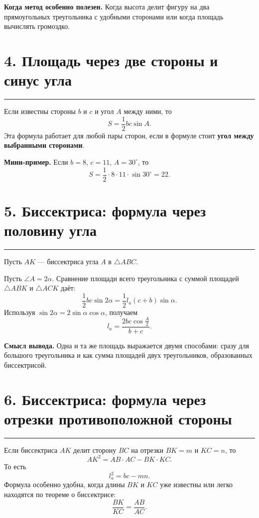 \documentclass[a4paper,12pt]{article}
\newcommand{\sectionline}{\par\vspace{0.2em}\noindent\color{rulegray}\rule{\linewidth}{0.6pt}\par\color{textgray}\vspace{0.45em}}
\newcommand{\key}[1]{\textcolor{darkaccent}{\textbf{#1}}}
\newcommand{\formula}[1]{\[\boxed{#1}\]}
\begin{document}
\key{Когда метод особенно полезен.} Когда высота делит фигуру на два прямоугольных треугольника с удобными сторонами или когда площадь вычислять громоздко.

\section*{4. Площадь через две стороны и синус угла}
\sectionline
Если известны стороны $b$ и $c$ и угол $A$ между ними, то
\formula{S=\frac12 bc\sin A.}
Эта формула работает для любой пары сторон, если в формуле стоит \key{угол между выбранными сторонами}.

\textbf{Мини-пример.} Если $b=8$, $c=11$, $A=30^\circ$, то
\[
S=\frac12\cdot8\cdot11\cdot\sin30^\circ=22.
\]

\clearpage
\section*{5. Биссектриса: формула через половину угла}
\sectionline
Пусть $AK$ --- биссектриса угла $A$ в $\triangle ABC$.

\begin{center}
\end{center}

Пусть $\angle A=2\alpha$. Сравнение площади всего треугольника с суммой площадей $\triangle ABK$ и $\triangle ACK$ даёт:
\[
\frac12 bc\sin 2\alpha
=\frac12 l_a(c+b)\sin\alpha.
\]
Используя $\sin2\alpha=2\sin\alpha\cos\alpha$, получаем
\formula{l_a=\frac{2bc\cos\frac A2}{b+c}.}

\key{Смысл вывода.} Одна и та же площадь выражается двумя способами: сразу для большого треугольника и как сумма площадей двух треугольников, образованных биссектрисой.

\section*{6. Биссектриса: формула через отрезки противоположной стороны}
\sectionline
Если биссектриса $AK$ делит сторону $BC$ на отрезки $BK=m$ и $KC=n$, то
\formula{AK^2=AB\cdot AC-BK\cdot KC.}
То есть
\[
l_a^2=bc-mn.
\]
Формула особенно удобна, когда длины $BK$ и $KC$ уже известны или легко находятся по теореме о биссектрисе:
\formula{\frac{BK}{KC}=\frac{AB}{AC}.}
\end{document}
